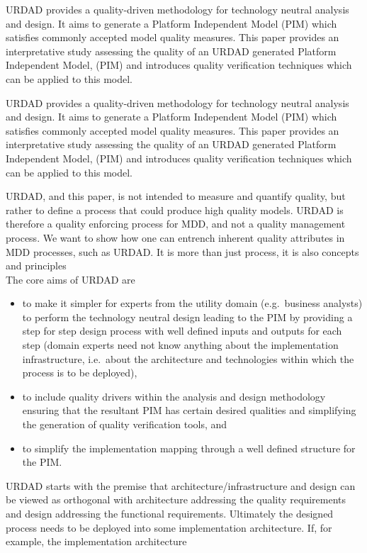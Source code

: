 \documentclass{llncs}
\begin{document}
URDAD provides a quality-driven methodology for technology neutral analysis and design. It
aims to generate a Platform Independent Model (PIM) which satisfies commonly accepted
model quality measures.
This paper provides an interpretative study assessing the quality of an URDAD generated Platform Independent Model, (PIM) and introduces quality verification techniques which can be applied to this model.

URDAD provides a quality-driven methodology for technology neutral analysis and design. It
aims to generate a Platform Independent Model (PIM) which satisfies commonly accepted
model quality measures.
This paper provides an interpretative study assessing the quality of an URDAD generated Platform Independent Model, (PIM) and introduces quality verification techniques which can be applied to this model.

URDAD, and this paper, is not intended to measure and quantify quality, but rather to define a process that could produce high quality models. URDAD is therefore a quality enforcing process for MDD, and not a quality management process. We want to show how one can entrench inherent quality attributes in MDD processes, such as URDAD. It is more than just process, it is also concepts and principles\\


The core aims of URDAD are
\begin{itemize}
  \item to make it simpler for experts from the utility domain (e.g.\ business analysts)
		  to perform the technology neutral design leading to the PIM by providing a step
		  for step design process with well defined inputs and outputs for each step (domain
		  experts need not know anything	about the implementation infrastructure,
		  i.e.\ about the architecture and technologies within which the process is to be deployed),
  \item to include quality drivers within the analysis and design methodology ensuring that
		the resultant PIM has certain desired qualities and simplifying the generation of
		quality verification tools, and
  \item to simplify the implementation mapping through a well defined structure for the PIM.
\end{itemize}

URDAD starts with the premise that architecture/infrastructure and design can be viewed as orthogonal with architecture addressing the quality requirements and design addressing the functional requirements. Ultimately the designed process needs to be deployed into some implementation architecture. If, for example, the implementation architecture
\end{document}
